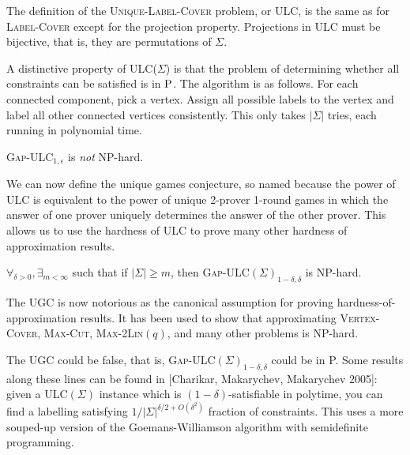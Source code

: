 \documentclass[12pt]{article}
\begin{document}
\begin{definition}
The definition of the \textsc{Unique-Label-Cover} problem, or ULC,
is the same as
for \textsc{Label-Cover} except for the projection property. Projections in
ULC must be bijective, that is, they are permutations of $\Sigma$.
\end{definition}

A distinctive property of ULC($\Sigma$) is that the problem of determining
whether all constraints can be satisfied is in $\P$. The algorithm is as
follows. For each connected component, pick a vertex.
Assign all possible labels to the vertex and label all other connected
vertices consistently. This only takes $|\Sigma|$ tries, each running
in polynomial time.

\begin{corollary}
\textsc{Gap-ULC}$_{1,\epsilon}$ is \emph{not} NP-hard.
\end{corollary}

We can now define the unique games conjecture, so named because the
power of ULC is equivalent to the power of unique 2-prover 1-round games
in which the answer of one prover uniquely determines the answer of the
other prover. This allows us to use
the hardness of ULC to prove many other hardness of approximation results.

\begin{definition} $\forall_{\delta > 0}, \exists_{m < \infty}$ such that if
$|\Sigma| \ge m$, then \textsc{Gap-ULC}$(\Sigma)_{1-\delta,\delta}$ is
NP-hard.
\end{definition}

\begin{remark}
The UGC is now notorious as the canonical assumption for proving
hardness-of-approximation results.
It has been used to show that approximating
\textsc{Vertex-Cover}, \textsc{Max-Cut}, \textsc{Max-2Lin}$(q)$, and many other 
problems is NP-hard.
\end{remark}

\begin{remark}
The UGC could be false, that is, \textsc{Gap-ULC}$(\Sigma)_{1-\delta,\delta}$
could be in P.  Some results along these lines can be found in
[Charikar, Makarychev, Makarychev 2005]: given a ULC$(\Sigma)$ instance which
is $(1-\delta)$-satisfiable in polytime, you can find a labelling satisfying
$1/|\Sigma|^{\delta/2 + O(\delta^2)}$ fraction of constraints. This uses a
more souped-up version of the Goemans-Williamson algorithm with
semidefinite programming.
\end{remark}
\end{document}
